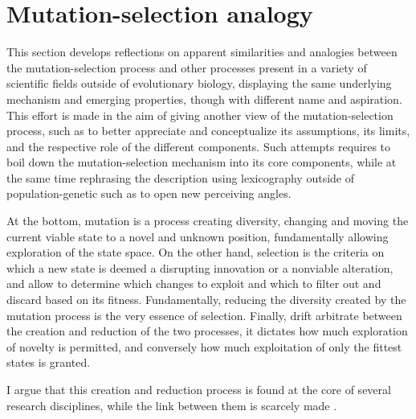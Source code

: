 \section{Mutation-selection analogy}

This section develops reflections on apparent similarities and analogies between the mutation-selection process and other processes present in a variety of scientific fields outside of evolutionary biology, displaying the same underlying mechanism and emerging properties, though with different name and aspiration.
This effort is made in the aim of giving another view of the mutation-selection process, such as to better appreciate and conceptualize its assumptions, its limits, and the respective role of the different components. 
Such attempts requires to boil down the mutation-selection mechanism into its core components, while at the same time rephrasing the description using lexicography outside of population-genetic such as to open new perceiving angles.

At the bottom, mutation is a process creating diversity, changing and moving the current viable state to a novel and unknown position, fundamentally allowing exploration of the state space.
On the other hand, selection is the criteria on which a new state is deemed a disrupting innovation or a nonviable alteration, and allow to determine which changes to exploit and which to filter out and discard based on its fitness.
Fundamentally, reducing the diversity created by the mutation process is the very essence of selection.
Finally, drift arbitrate between the creation and reduction of the two processes, it dictates how much exploration of novelty is permitted, and conversely how much exploitation of only the fittest states is granted.

I argue that this creation and reduction process is found at the core of several research disciplines, while the link between them is scarcely made \citep{Baeck1994, Eiben1998}. 

